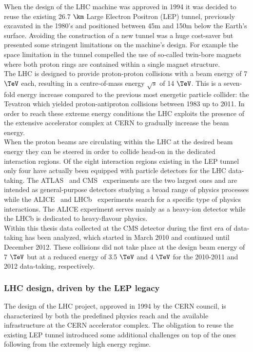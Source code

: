 When the design of the LHC machine was approved in 1994 it was decided to reuse the existing 26.7 $\km$ Large Electron Positron (LEP) tunnel, previously excavated in the 1980's and positioned between 45m and 150m below the Earth's surface.
Avoiding the construction of a new tunnel was a huge cost-saver but presented some stringent limitations on the machine's design. For example the space limitation in the tunnel compelled the use of so-called twin-bore magnets where both proton rings are contained within a single magnet structure.
\\
The LHC is designed to provide proton-proton collisions with a beam energy of 7 $\TeV$ each, resulting in a centre-of-mass energy $\sqrt{s}$ of 14 $\TeV$. This is a seven-fold energy increase compared to the previous most energetic particle collider: the Tevatron which yielded proton-antiproton collisions between 1983 up to 2011. In order to reach these extreme energy conditions the LHC exploits the presence of the extensive accelerator complex at CERN to gradually increase the beam energy. 
\\
When the proton beams are circulating within the LHC at the desired beam energy they can be steered in order to collide head-on in the dedicated interaction regions. Of the eight interaction regions existing in the LEP tunnel only four have actually been equipped with particle detectors for the LHC data-taking. The ATLAS~\cite{AtlasDetectorPaper} and CMS~\cite{CMSDetectorPaper} experiments are the two largest ones and are intended as general-purpose detectors studying a broad range of physics processes while the ALICE~\cite{AliceDetectorPaper} and LHCb~\cite{LHCbDetectorPaper} experiments search for a specific type of physics interactions. The ALICE experiment serves mainly as a heavy-ion detector while the LHCb is dedicated to heavy-flavour physics.
\\
Within this thesis data collected at the CMS detector during the first era of data-taking has been analyzed, which started in March 2010 and continued until December 2012. These collisions did not take place at the design beam energy of 7 $\TeV$ but at a reduced energy of 3.5 $\TeV$ and 4 $\TeV$ for the 2010-2011 and 2012 data-taking, respectively.

\subsubsection{LHC design, driven by the LEP legacy}
The design of the LHC project, approved in 1994 by the CERN council, is characterized by both the predefined physics reach and the available infrastructure at the CERN accelerator complex.
The obligation to reuse the existing LEP tunnel introduced some additional challenges on top of the ones following from the extremely high energy regime. 
\\

